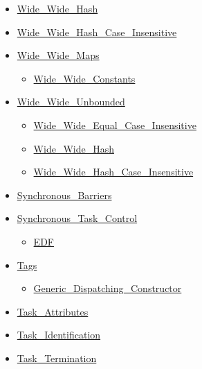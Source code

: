 \documentclass[english]{article}
\begin{document}
\begin{scriptsize}
\begin{multicols*}{5}
\begin{itemize}[leftmargin=0mm]
\begin{itemize}[leftmargin=5mm]
\begin{itemize}[leftmargin=5mm]
	\item[] \href{http://www.ada-auth.org/standards/22rm/html/RM-A-4-8.html}{Wide\_Wide\_Hash}
	\item[] \href{http://www.ada-auth.org/standards/22rm/html/RM-A-4-8.html}{Wide\_Wide\_Hash\_Case\_Insensitive}
	\item[] \href{http://www.ada-auth.org/standards/22rm/html/RM-A-4-8.html}{Wide\_Wide\_Maps}
	  \begin{itemize}[leftmargin=5mm]
	  \item[] \href{http://www.ada-auth.org/standards/22rm/html/RM-A-4-8.html}{Wide\_Wide\_Constants}
	  \end{itemize}
	\item[] \href{http://www.ada-auth.org/standards/22rm/html/RM-A-4-8.html}{Wide\_Wide\_Unbounded}
	  \begin{itemize}[leftmargin=5mm]
	  \item[] \href{http://www.ada-auth.org/standards/22rm/html/RM-A-4-8.html}{Wide\_Wide\_Equal\_Case\_Insensitive}
	  \item[] \href{http://www.ada-auth.org/standards/22rm/html/RM-A-4-8.html}{Wide\_Wide\_Hash}
	  \item[] \href{http://www.ada-auth.org/standards/22rm/html/RM-A-4-8.html}{Wide\_Wide\_Hash\_Case\_Insensitive}
	  \end{itemize}
	\item[] \href{http://www.ada-auth.org/standards/22rm/html/RM-D-10-1.html}{Synchronous\_Barriers}
	\item[] \href{http://www.ada-auth.org/standards/22rm/html/RM-D-10.html}{Synchronous\_Task\_Control}
	  \begin{itemize}[leftmargin=5mm]
	  \item[] \href{http://www.ada-auth.org/standards/22rm/html/RM-D-10.html}{EDF}
	  \end{itemize}
	\item[] \href{http://www.ada-auth.org/standards/22rm/html/RM-3-9.html}{Tags}
	  \begin{itemize}[leftmargin=5mm]
	  \item[] \href{http://www.ada-auth.org/standards/22rm/html/RM-3-9.html}{Generic\_Dispatching\_Constructor}
	  \end{itemize}
	\item[] \href{http://www.ada-auth.org/standards/22rm/html/RM-C-7-2.html}{Task\_Attributes}
	\item[] \href{http://www.ada-auth.org/standards/22rm/html/RM-C-7-1.html}{Task\_Identification}
	\item[] \href{http://www.ada-auth.org/standards/22rm/html/RM-C-7-3.html}{Task\_Termination}

\end{itemize}
\end{itemize}
\end{itemize}
\end{multicols*}
\end{scriptsize}
\end{document}
